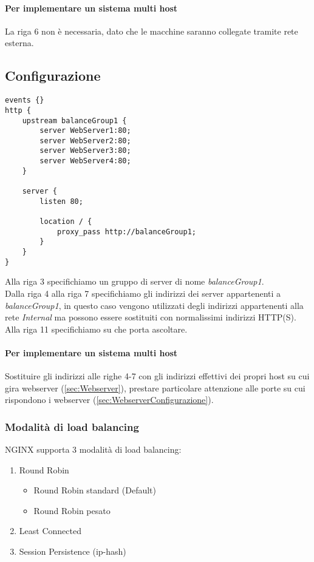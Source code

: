 \documentclass[../DocumentazioneProgetto.tex]{subfiles}
\begin{document}
	\paragraph{Per implementare un sistema multi host} 
	La riga 6 non è necessaria, dato che le macchine saranno collegate tramite rete esterna.
	\subsection{Configurazione} 
	\label{sec:LoadBalancerConfig}
	\begin{lstlisting}[caption=File di configurazione Load Balancer NGINX] 
events {}
http {
	upstream balanceGroup1 {
		server WebServer1:80;
		server WebServer2:80;
		server WebServer3:80;
		server WebServer4:80;
	}

	server {
		listen 80;
		
		location / {
			proxy_pass http://balanceGroup1;
		}
	}
}\end{lstlisting}
	Alla riga 3 specifichiamo un gruppo di server di nome \textit{balanceGroup1}.\\
	Dalla riga 4 alla riga 7 specifichiamo gli indirizzi dei server appartenenti a \textit{balanceGroup1}, in questo caso vengono
	utilizzati degli indirizzi appartenenti alla rete \textit{Internal} ma possono essere sostituiti con normalissimi indirizzi HTTP(S).\\
	Alla riga 11 specifichiamo su che porta ascoltare.
	\paragraph{Per implementare un sistema multi host} Sostituire gli indirizzi alle righe 4-7 con gli indirizzi effettivi dei propri host su cui gira webserver (\autoref{sec:Webserver}), prestare particolare attenzione alle porte su cui rispondono i webserver (\autoref{sec:WebserverConfigurazione}).
	\subsubsection{Modalità di load balancing} 
	NGINX supporta 3 modalità di load balancing:
	\begin{enumerate}
		\item Round Robin
		\begin{itemize}
			\item Round Robin standard (Default)
			\item Round Robin pesato
		\end{itemize}
		\item Least Connected
		\item Session Persistence (ip-hash)
	\end{enumerate}
\end{document}
